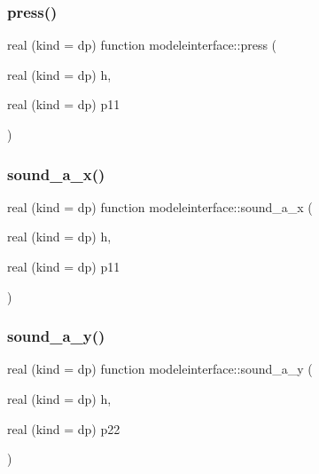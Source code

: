 \mbox{\label{namespacemodeleinterface_ad34088de8c0162343994153e8f34921e}} 
\subsubsection{\texorpdfstring{press()}{press()}}
{\footnotesize\ttfamily real (kind = dp) function modeleinterface\+::press (\begin{DoxyParamCaption}\item[{real (kind = dp)}]{h,  }\item[{real (kind = dp)}]{p11 }\end{DoxyParamCaption})}

\mbox{\label{namespacemodeleinterface_a1505c575aa44b45a8509fe827f28bc8d}} 
\subsubsection{\texorpdfstring{sound\+\_\+a\+\_\+x()}{sound\_a\_x()}}
{\footnotesize\ttfamily real (kind = dp) function modeleinterface\+::sound\+\_\+a\+\_\+x (\begin{DoxyParamCaption}\item[{real (kind = dp)}]{h,  }\item[{real (kind = dp)}]{p11 }\end{DoxyParamCaption})}

\mbox{\label{namespacemodeleinterface_aea42339ec55b6d0e7333dcd4c2d6041f}} 
\subsubsection{\texorpdfstring{sound\+\_\+a\+\_\+y()}{sound\_a\_y()}}
{\footnotesize\ttfamily real (kind = dp) function modeleinterface\+::sound\+\_\+a\+\_\+y (\begin{DoxyParamCaption}\item[{real (kind = dp)}]{h,  }\item[{real (kind = dp)}]{p22 }\end{DoxyParamCaption})}

